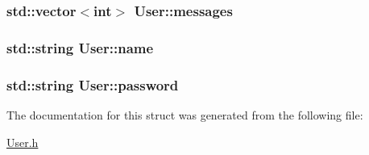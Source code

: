 \subsubsection[{\texorpdfstring{messages}{messages}}]{\setlength{\rightskip}{0pt plus 5cm}std\+::vector$<$int$>$ User\+::messages}\hypertarget{structUser_a1b194a13658a19f18233e0d5b102e295}{}\label{structUser_a1b194a13658a19f18233e0d5b102e295}
\subsubsection[{\texorpdfstring{name}{name}}]{\setlength{\rightskip}{0pt plus 5cm}std\+::string User\+::name}\hypertarget{structUser_a085d8d69282b6298964eab8351584536}{}\label{structUser_a085d8d69282b6298964eab8351584536}
\subsubsection[{\texorpdfstring{password}{password}}]{\setlength{\rightskip}{0pt plus 5cm}std\+::string User\+::password}\hypertarget{structUser_ac2f2e75b15e8eb6cbb030fc85a6cd59f}{}\label{structUser_ac2f2e75b15e8eb6cbb030fc85a6cd59f}


The documentation for this struct was generated from the following file\+:\begin{DoxyCompactItemize}
\item 
\hyperlink{User_8h}{User.\+h}\end{DoxyCompactItemize}
